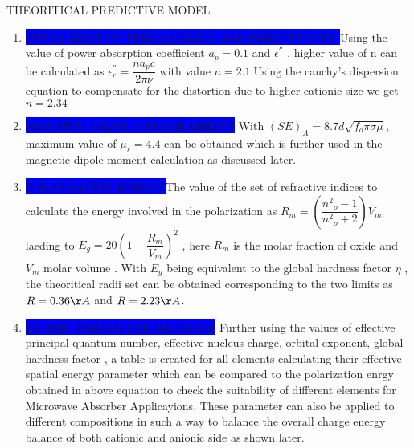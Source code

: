 \documentclass[11pt,aspect ratio=169]{beamer}
\begin{document}
\begin{frame}[t,allowframebreaks]{THEORITICAL PREDICTIVE MODEL}
\begin{enumerate}
	\item \colorbox{blue}{UPPER LIMIT OF PERMEABILITY AND PERMITTIVITY }Using the value of power absorption coefficient $a_p =0.1$ and $\epsilon^{''}$ , higher value of n can be calculated as $\epsilon^{''}_r  = \dfrac{n a_p c}{2 \pi \nu}$ with value $n=2.1$.Using the cauchy's dispersion equation to compensate for the distortion due to higher cationic size we get $n=2.34$ 
	\item \colorbox{blue}{MAXIMUM VALUE of PERMEABILITY} With $(SE)_A = 8.7d\sqrt{f_o \pi \sigma \mu}$, maximum value of $\mu_r = 4.4$ can be obtained which is further used in the magnetic dipole moment calculation as discussed later.
	\item \colorbox{blue}{POLARISATION ENERGY}The value of the set of refractive indices to calculate the energy involved in the polarization as $R_m = (\dfrac{{n^2}_o -1}{{n^2}_o +2 })V_m$ laeding to $E_g = 20(1- \dfrac{R_m}{V_m})^2$ , here $R_m$ is the molar fraction of oxide and $V_m$ molar volume . With $E_g$ being equivalent to the global hardness factor $\eta$ , the theoritical radii set can be obtained corresponding to the two limits as $R=0.36 \AA$ and $R = 2.23 \AA$.
	\item \colorbox{blue}{ATOMIC PARAMETER DATABASE} Further using the values of effective principal quantum number, effective nucleus charge, orbital exponent, global hardness factor , a table is created for all elements calculating their effective spatial energy parameter which can be compared to the polarization enrgy obtained in above equation to check the suitability of different elements for Microwave Absorber Applicayions. These parameter can also be applied to different  compositions in such a way to balance the overall charge energy balance of both cationic and anionic side as shown later.
	
	
\end{enumerate}

\end{frame}
\end{document}
